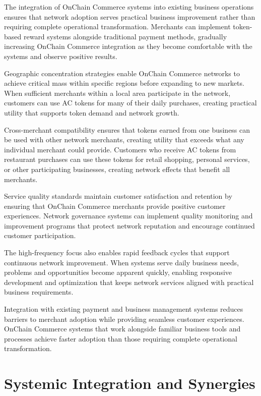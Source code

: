 \documentclass[
  Letterpaper,
]{scrbook}
\begin{document}
The integration of OnChain Commerce systems into existing business
operations ensures that network adoption serves practical business
improvement rather than requiring complete operational transformation.
Merchants can implement token-based reward systems alongside traditional
payment methods, gradually increasing OnChain Commerce integration as
they become comfortable with the systems and observe positive results.

Geographic concentration strategies enable OnChain Commerce networks to
achieve critical mass within specific regions before expanding to new
markets. When sufficient merchants within a local area participate in
the network, customers can use AC tokens for many of their daily
purchases, creating practical utility that supports token demand and
network growth.

Cross-merchant compatibility ensures that tokens earned from one
business can be used with other network merchants, creating utility that
exceeds what any individual merchant could provide. Customers who
receive AC tokens from restaurant purchases can use these tokens for
retail shopping, personal services, or other participating businesses,
creating network effects that benefit all merchants.

Service quality standards maintain customer satisfaction and retention
by ensuring that OnChain Commerce merchants provide positive customer
experiences. Network governance systems can implement quality monitoring
and improvement programs that protect network reputation and encourage
continued customer participation.

The high-frequency focus also enables rapid feedback cycles that support
continuous network improvement. When systems serve daily business needs,
problems and opportunities become apparent quickly, enabling responsive
development and optimization that keeps network services aligned with
practical business requirements.

Integration with existing payment and business management systems
reduces barriers to merchant adoption while providing seamless customer
experiences. OnChain Commerce systems that work alongside familiar
business tools and processes achieve faster adoption than those
requiring complete operational transformation.

\section{Systemic Integration and
Synergies}\label{systemic-integration-and-synergies}
\end{document}
